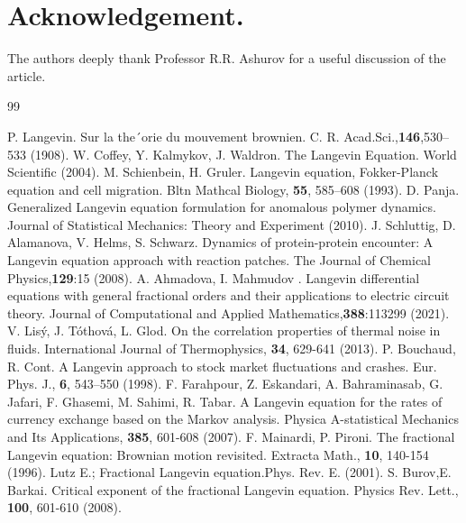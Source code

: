 \documentclass{amsart}
\numberwithin{equation}{section}
\begin{document}
\section{Acknowledgement.}

The authors deeply thank Professor R.R. Ashurov for a useful discussion of the article.







 \begin{thebibliography}{99}
 \normalsize

%
  P. Langevin. Sur la the´orie du mouvement brownien. C. R. Acad.Sci.,{\bf 146},530–533 (1908).
 W. Coffey, Y. Kalmykov, J. Waldron. The Langevin Equation. World Scientific (2004).
 M. Schienbein, H. Gruler. Langevin equation, Fokker-Planck equation and cell migration. Bltn Mathcal Biology, {\bf 55}, 585–608 (1993).
  D. Panja. Generalized Langevin equation formulation for anomalous polymer dynamics. Journal of Statistical Mechanics: Theory and Experiment (2010).
 J. Schluttig, D. Alamanova, V. Helms,  S. Schwarz. Dynamics of protein-protein encounter: A Langevin equation approach with reaction patches. The Journal of Chemical Physics,{\bf 129}:15 (2008).
  A. Ahmadova, I. Mahmudov . Langevin differential equations with general fractional orders and their applications to electric circuit theory. Journal of Computational and Applied Mathematics,{\bf 388}:113299 (2021).
  V. Lisý, J. Tóthová, L. Glod. On the correlation properties of thermal noise in fluids. International Journal of Thermophysics, {\bf 34}, 629-641 (2013).
 P. Bouchaud, R.  Cont. A Langevin approach to stock market fluctuations and crashes. Eur. Phys. J., {\bf 6},  543–550 (1998).
 F. Farahpour, Z. Eskandari, A. Bahraminasab, G. Jafari, F. Ghasemi, M. Sahimi, R. Tabar. A Langevin equation for the rates of currency exchange based on the Markov analysis. Physica A-statistical Mechanics and Its Applications, {\bf 385}, 601-608 (2007).
 F. Mainardi, P. Pironi. The fractional Langevin equation: Brownian motion revisited. Extracta Math., {\bf 10}, 140-154 (1996).
Lutz E.; Fractional Langevin equation.Phys. Rev. E. (2001).
S. Burov,E. Barkai. Critical exponent of the fractional Langevin equation. Physics Rev. Lett., {\bf 100}, 601-610 (2008).

\end{thebibliography}
\end{document}
